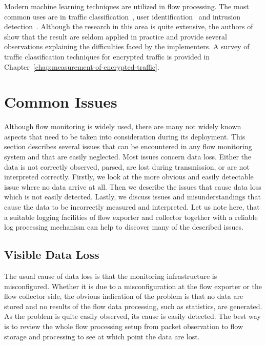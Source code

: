 Modern machine learning techniques are utilized in flow processing. The most common uses are in traffic classification~\cite{Velan-2015-Survey}, user identification~\cite{Verde-2014-No} and intrusion detection~\cite{Tsai-2009-Intrusion}. Although the research in this area is quite extensive, the authors of~\cite{Sommer-2010-Outside} show that the result are seldom applied in practice and provide several observations explaining the difficulties faced by the implementers. A survey of traffic classification techniques for encrypted traffic is provided in Chapter~\ref{chap:measurement-of-encrypted-traffic}.


\section{Common Issues}

Although flow monitoring is widely used, there are many not widely known aspects that need to be taken into consideration during its deployment. This section describes several issues that can be encountered in any flow monitoring system and that are easily neglected. Most issues concern data loss. Either the data is not correctly observed, parsed, are lost during transmission, or are not interpreted correctly. Firstly, we look at the more obvious and easily detectable issue where no data arrive at all. Then we describe the issues that cause data loss which is not easily detected. Lastly, we discuss issues and misunderstandings that cause the data to be incorrectly measured and interpreted. Let us note here, that a suitable logging facilities of flow exporter and collector together with a reliable log processing mechanism can help to discover many of the described issues.

\subsection{Visible Data Loss}

The usual cause of data loss is that the monitoring infrastructure is misconfigured. Whether it is due to a misconfiguration at the flow exporter or the flow collector side, the obvious indication of the problem is that no data are stored and no results of the flow data processing, such as statistics, are generated. As the problem is quite easily observed, its cause is easily detected. The best way is to review the whole flow processing setup from packet observation to flow storage and processing to see at which point the data are lost.

